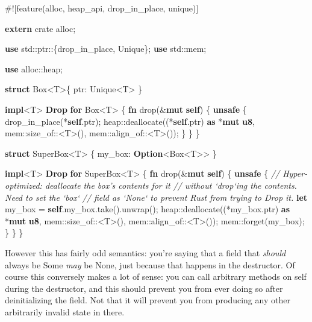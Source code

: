 \documentclass[a4paper,]{book}
\newenvironment{Shaded}{\begin{snugshade}}{\end{snugshade}}
\newcommand{\KeywordTok}[1]{\textcolor[rgb]{0.13,0.29,0.53}{\textbf{{#1}}}}
\newcommand{\CommentTok}[1]{\textcolor[rgb]{0.56,0.35,0.01}{\textit{{#1}}}}
\newcommand{\NormalTok}[1]{{#1}}
\begin{document}
\begin{Shaded}
\begin{Highlighting}[]
\NormalTok{#![feature(alloc, heap_api, drop_in_place, unique)]}

\KeywordTok{extern} \NormalTok{crate alloc;}

\KeywordTok{use} \NormalTok{std::ptr::\{drop_in_place, Unique\};}
\KeywordTok{use} \NormalTok{std::mem;}

\KeywordTok{use} \NormalTok{alloc::heap;}

\KeywordTok{struct} \NormalTok{Box<T>\{ ptr: Unique<T> \}}

\KeywordTok{impl}\NormalTok{<T> }\KeywordTok{Drop} \KeywordTok{for} \NormalTok{Box<T> \{}
    \KeywordTok{fn} \NormalTok{drop(&}\KeywordTok{mut} \KeywordTok{self}\NormalTok{) \{}
        \KeywordTok{unsafe} \NormalTok{\{}
            \NormalTok{drop_in_place(*}\KeywordTok{self}\NormalTok{.ptr);}
            \NormalTok{heap::deallocate((*}\KeywordTok{self}\NormalTok{.ptr) }\KeywordTok{as} \NormalTok{*}\KeywordTok{mut} \KeywordTok{u8}\NormalTok{,}
                             \NormalTok{mem::size_of::<T>(),}
                             \NormalTok{mem::align_of::<T>());}
        \NormalTok{\}}
    \NormalTok{\}}
\NormalTok{\}}

\KeywordTok{struct} \NormalTok{SuperBox<T> \{ my_box: }\KeywordTok{Option}\NormalTok{<Box<T>> \}}

\KeywordTok{impl}\NormalTok{<T> }\KeywordTok{Drop} \KeywordTok{for} \NormalTok{SuperBox<T> \{}
    \KeywordTok{fn} \NormalTok{drop(&}\KeywordTok{mut} \KeywordTok{self}\NormalTok{) \{}
        \KeywordTok{unsafe} \NormalTok{\{}
            \CommentTok{// Hyper-optimized: deallocate the box's contents for it}
            \CommentTok{// without `drop`ing the contents. Need to set the `box`}
            \CommentTok{// field as `None` to prevent Rust from trying to Drop it.}
            \KeywordTok{let} \NormalTok{my_box = }\KeywordTok{self}\NormalTok{.my_box.take().unwrap();}
            \NormalTok{heap::deallocate((*my_box.ptr) }\KeywordTok{as} \NormalTok{*}\KeywordTok{mut} \KeywordTok{u8}\NormalTok{,}
                             \NormalTok{mem::size_of::<T>(),}
                             \NormalTok{mem::align_of::<T>());}
            \NormalTok{mem::forget(my_box);}
        \NormalTok{\}}
    \NormalTok{\}}
\NormalTok{\}}
\end{Highlighting}
\end{Shaded}

However this has fairly odd semantics: you're saying that a field that
\emph{should} always be Some \emph{may} be None, just because that
happens in the destructor. Of course this conversely makes a lot of
sense: you can call arbitrary methods on self during the destructor, and
this should prevent you from ever doing so after deinitializing the
field. Not that it will prevent you from producing any other arbitrarily
invalid state in there.
\end{document}
